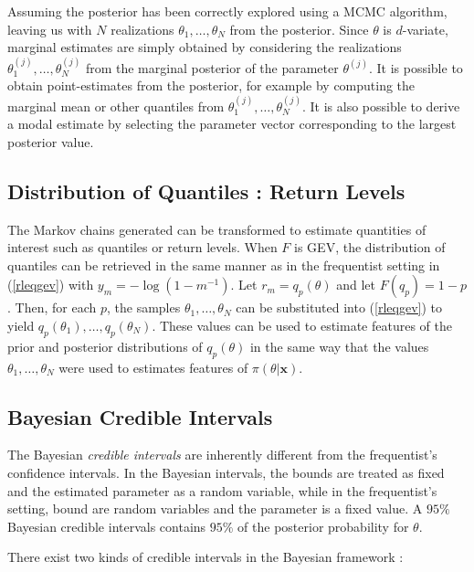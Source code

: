 Assuming the posterior has been correctly explored using a MCMC algorithm, leaving us with $N$ realizations $\theta_1,\ldots,\theta_N$ from the posterior. Since $\theta$ is $d$-variate, marginal estimates are simply obtained by considering the realizations $\theta_1^{(j)},\ldots,\theta_N^{(j)}$  from the marginal posterior of the parameter $\theta^{(j)}$. It is possible to obtain point-estimates from the posterior, for example by computing the marginal mean or other quantiles from  $\theta_1^{(j)},\ldots,\theta_N^{(j)}$. It is also possible to derive a modal estimate by selecting the parameter vector corresponding to the largest posterior value.

\subsection{Distribution of Quantiles : Return Levels}

The Markov chains generated can be transformed to estimate quantities of interest such as quantiles or return levels.
When $F$ is GEV, the distribution of quantiles can be retrieved in the same manner as in the frequentist setting in (\ref{rleqgev}) with $y_m = -\log(1-m^{-1})$. Let $r_m= q_p(\theta)$ and let $F(q_p)=1-p$. Then, for each $p$, the samples $\theta_1,\ldots,\theta_N$ can be substituted into (\ref{rleqgev}) to yield $q_p(\theta_1),\ldots,q_p(\theta_N)$. These values can be used to estimate features of the prior and posterior distributions of $q_p(\theta)$ in the same way that the values $\theta_1,\ldots,\theta_N$ were used to estimates features of $\pi(\theta|\boldsymbol{x})$. 


\subsection{Bayesian Credible Intervals}\label{bayes_cred_int}

The Bayesian \emph{credible intervals} are inherently different from the frequentist's confidence intervals. In the Bayesian intervals, the bounds are treated as fixed and the estimated parameter as a random variable, while in the frequentist's setting, bound are random variables and the parameter is a fixed value. A $95\%$ Bayesian credible intervals contains $95\%$ of the posterior probability for $\theta$.

There exist two kinds of credible intervals in the Bayesian framework : 

